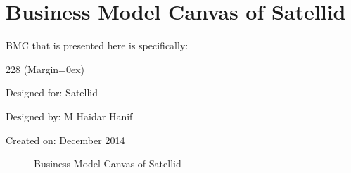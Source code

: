 \section{Business Model Canvas of Satellid}
\label{sec:bmc-satellid}

\ac{BMC} that is presented here is specifically:

\begin{dinglist}{228}
\ListProperties(Margin=0ex)
\item Designed for: Satellid
\item Designed by: M Haidar Hanif
\item Created on: December 2014
\end{dinglist}

\begin{figure}[htbp]
    \centering
    \caption{Business Model Canvas of Satellid}
    \label{fig:bmc:satellid}
\end{figure}

